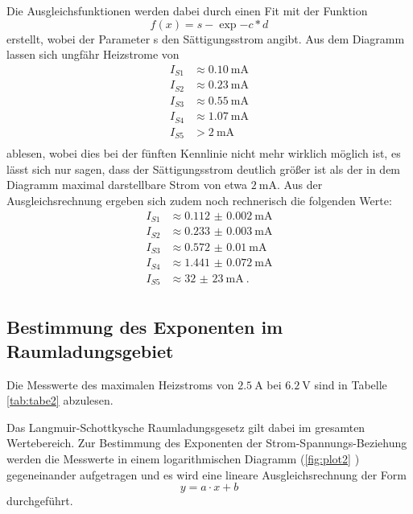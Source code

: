 Die Ausgleichsfunktionen werden dabei durch einen Fit mit der Funktion
\begin{equation}
  f(x) = s- \exp{-c*d}
\end{equation}
erstellt, wobei der Parameter s den Sättigungsstrom angibt.
Aus dem Diagramm lassen sich ungfähr Heizstrome von
\begin{align*}
  I_{S1} &\approx \SI{0.10}{\milli\ampere}  \\
  I_{S2} &\approx \SI{0.23}{\milli\ampere}  \\
  I_{S3} &\approx \SI{0.55}{\milli\ampere}  \\
  I_{S4} &\approx \SI{1.07}{\milli\ampere}  \\
  I_{S5} &> \SI{2}{\milli\ampere}  \\
\end{align*}
ablesen, wobei dies bei der fünften Kennlinie nicht mehr wirklich möglich ist, es lässt sich nur sagen,
dass der Sättigungsstrom deutlich größer ist als der in dem Diagramm maximal darstellbare
Strom von etwa $\SI{2}{\milli\ampere}$.
Aus der Ausgleichsrechnung ergeben sich zudem noch rechnerisch die folgenden Werte:
\begin{align*}
  I_{S1} &\approx \SI{0.112(2)}{\milli\ampere}  \\
  I_{S2} &\approx \SI{0.233(3)}{\milli\ampere}  \\
  I_{S3} &\approx \SI{0.572(10)}{\milli\ampere}  \\
  I_{S4} &\approx \SI{1.441(72)}{\milli\ampere}  \\
  I_{S5} &\approx \SI{32(23)}{\milli\ampere} \: . \\
\end{align*}

\subsection{Bestimmung des Exponenten im Raumladungsgebiet}
Die Messwerte des maximalen Heizstroms von $\SI{2.5}{\ampere}$ bei $\SI{6.2}{\volt}$
sind in Tabelle \ref{tab:tabe2} abzulesen.

Das Langmuir-Schottkysche Raumladungsgesetz gilt dabei im gresamten Wertebereich.
Zur Bestimmung des Exponenten der Strom-Spannungs-Beziehung werden die Messwerte
in einem logarithmischen Diagramm (\ref{fig:plot2} ) gegeneinander aufgetragen und
es wird eine lineare Ausgleichsrechnung der Form
\begin{equation}
  y = a\cdot x +b
  \label{eqn:linear}
\end{equation}
durchgeführt.


